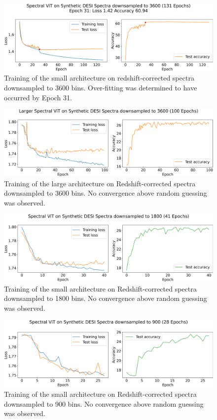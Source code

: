 \begin{figure}
    \centering
    \includegraphics[width=.8\linewidth]{figures/v1_real/vit_model_V1_original_redotraining_new.png}
    \caption{Training of the small architecture on redshift-corrected spectra downsampled to 3600 bins. Over-fitting was determined to have occurred by Epoch 31.}
    \label{fig:vit1_training}
\end{figure}



\begin{figure}
    \centering
    \includegraphics[width=.8\linewidth]{figures/v1_real/vit_model_V1_bigtraining_new.png}
    \caption{Training of the large architecture on Redshift-corrected spectra downsampled to 3600 bins. No convergence above random guessing was observed. }
    \label{fig:vit1_big_training}
\end{figure}

\begin{figure}
    \centering
    \includegraphics[width=.8\linewidth]{figures/vit_model_V1.2training_new.png}
    \caption{Training of the small architecture on Redshift-corrected spectra downsampled to 1800 bins. No convergence above random guessing was observed. }
    \label{fig:vit1_big_training}
\end{figure}

\begin{figure}
    \centering
    \includegraphics[width=.8\linewidth]{figures/vit_model_V1.3_muchsmallermodeltraining_new.png}
    \caption{Training of the small architecture on Redshift-corrected spectra downsampled to 900 bins. No convergence above random guessing was observed. }
    \label{fig:vit1_big_training}
\end{figure}



